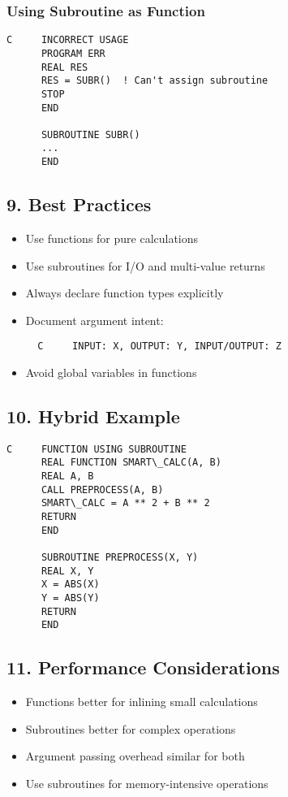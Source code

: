 \documentclass{book}
\begin{document}
\subsubsection*{Using Subroutine as Function}
\begin{verbatim}
C     INCORRECT USAGE
      PROGRAM ERR
      REAL RES
      RES = SUBR()  ! Can't assign subroutine
      STOP
      END

      SUBROUTINE SUBR()
      ...
      END
\end{verbatim}

\subsection*{9. Best Practices}
\begin{itemize}
\item Use functions for pure calculations
\item Use subroutines for I/O and multi-value returns
\item Always declare function types explicitly
\item Document argument intent:
  \begin{verbatim}
  C     INPUT: X, OUTPUT: Y, INPUT/OUTPUT: Z
  \end{verbatim}
\item Avoid global variables in functions
\end{itemize}

\subsection*{10. Hybrid Example}
\begin{verbatim}
C     FUNCTION USING SUBROUTINE
      REAL FUNCTION SMART\_CALC(A, B)
      REAL A, B
      CALL PREPROCESS(A, B)
      SMART\_CALC = A ** 2 + B ** 2
      RETURN
      END

      SUBROUTINE PREPROCESS(X, Y)
      REAL X, Y
      X = ABS(X)
      Y = ABS(Y)
      RETURN
      END
\end{verbatim}

\subsection*{11. Performance Considerations}
\begin{itemize}
\item Functions better for inlining small calculations
\item Subroutines better for complex operations
\item Argument passing overhead similar for both
\item Use subroutines for memory-intensive operations
\end{itemize}
\end{document}
